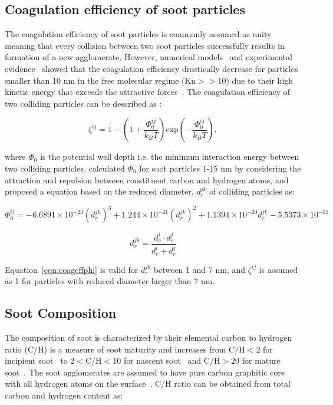 \subsection{Coagulation efficiency of soot particles}
\label{sec:coageff}

The coagulation efficiency of soot particles is commonly assumed as unity meaning that every collision between two soot particles successfully results in formation of a new agglomerate. However, numerical models~\citep{narsimhan1985brownian} and experimental evidence~\citep{d2005surface} showed that the coagulation efficiency drastically decrease for particles smaller than 10 nm in the free molecular regime (Kn$>>$10) due to their high kinetic energy that exceeds the attractive forces~\citep{wang1991filtration}. The coagulation efficiency of two colliding particles can be described as \cite{narsimhan1985brownian}:

\begin{equation}
	\zeta^{ij} = 1 - 
	\left(1 + \frac{\Phi^{ij}_0}{k_BT} \right)
	\mathrm{exp}\left(-\frac{\Phi^{ij}_0}{k_BT}\right),
	\label{eqn:coageff}
\end{equation}

\noindent where $\Phi_0$ is the potential well depth i.e. the minimum interaction energy between two colliding particles. \citet{hou2020coagulation} calculated $\Phi_0$ for soot particles 1-15 nm by considering the attraction and repulsion between constituent carbon and hydrogen atoms, and proposed a equation based on the reduced diameter, $d^{jk}_r$ of colliding particles as:

\begin{equation}
	\Phi^{ij}_0 = -6.6891\times10^{-23} (d^{jk}_r)^3 + 1.244\times10^{-21} (d^{jk}_r)^2 + 1.1394\times10^{-20} d^{jk}_r - 5.5373\times10^{-21}
	\label{eqn:coageffphi}
\end{equation}

\begin{equation}
	d^{jk}_r = \frac{d^i_c\cdot d^j_c}{d^i_c+d^j_c}
	\label{eqn:coageffredcueddia}
\end{equation}

Equation~\eqref{eqn:coageffphi} is valid for $d^{jk}_r$ between 1 and 7 nm, and $\zeta^{ij}$ is assumed as 1 for particles with reduced diameter larger than 7 nm.

\subsection{Soot Composition}
The composition of soot is characterized by their elemental carbon to hydrogen ratio (C/H) is a measure of soot maturity and increases from $\mathrm{C/H<2}$ for incipient soot~\citep{ciajolo1998spectroscopic} to $\mathrm{2<C/H<10}$ for nascent soot~\citep{betrancourt2017investigation} and $\mathrm{C/H>20}$ for mature soot~\citep{michelsen2017probing}. The soot agglomerates are assumed to have pure carbon graphitic core~\citep{kholghy2016core} with all hydrogen atoms on the surface~\citep{blanquart2009analyzing}. C/H ratio can be obtained from total carbon and hydrogen content as:

